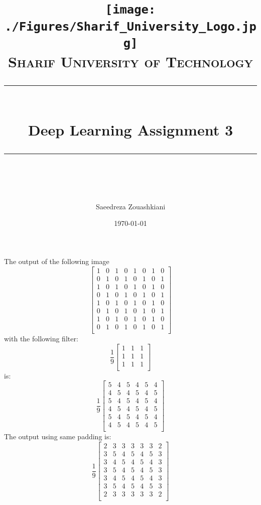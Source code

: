 \documentclass[11pt]{scrartcl} %
\title{	
	\texttt{[image: ./Figures/Sharif\_University\_Logo.jpg]}\\
	\normalfont\normalsize
	\textsc{Sharif University of Technology}\\ %
	\vspace{25pt} %
	\rule{\linewidth}{0.5pt}\\ %
	\vspace{20pt} %
	{\huge Deep Learning Assignment 3}\\ %
	\vspace{12pt} %
	\rule{\linewidth}{2pt}\\ %
	\vspace{12pt} %
}
\author{\LARGE Saeedreza Zouashkiani} %
\date{\normalsize\today} %
\begin{document}
\maketitle %

\section{} %
\subsection{} %
The output of the following image
\begin{equation}
\begin{bmatrix}
1 & 0 & 1 & 0 & 1 & 0 & 1 & 0\\
0 & 1 & 0 & 1 & 0 & 1 & 0 & 1\\
1 & 0 & 1 & 0 & 1 & 0 & 1 & 0\\
0 & 1 & 0 & 1 & 0 & 1 & 0 & 1\\
1 & 0 & 1 & 0 & 1 & 0 & 1 & 0\\
0 & 1 & 0 & 1 & 0 & 1 & 0 & 1\\
1 & 0 & 1 & 0 & 1 & 0 & 1 & 0\\
0 & 1 & 0 & 1 & 0 & 1 & 0 & 1\\
\end{bmatrix}
\end{equation}
with the following filter:
\begin{equation}
\frac{1}{9}
\begin{bmatrix}
1 & 1 & 1\\
1 & 1 & 1\\
1 & 1 & 1\\
\end{bmatrix}
\end{equation}
is:
\begin{equation}
\frac{1}{9}
\begin{bmatrix}
5 & 4 & 5 & 4 & 5 & 4 \\
4 & 5 & 4 & 5 & 4 & 5 \\
5 & 4 & 5 & 4 & 5 & 4 \\
4 & 5 & 4 & 5 & 4 & 5 \\
5 & 4 & 5 & 4 & 5 & 4 \\
4 & 5 & 4 & 5 & 4 & 5 \\
\end{bmatrix}
\end{equation}
The output using same padding is:
\begin{equation}
\frac{1}{9}
\begin{bmatrix}
2 & 3 & 3 & 3 & 3 & 3 & 2\\
3 & 5 & 4 & 5 & 4 & 5 & 3\\
3 & 4 & 5 & 4 & 5 & 4 & 3\\
3 & 5 & 4 & 5 & 4 & 5 & 3\\
3 & 4 & 5 & 4 & 5 & 4 & 3\\
3 & 5 & 4 & 5 & 4 & 5 & 3\\
2 & 3 & 3 & 3 & 3 & 3 & 2\\
\end{bmatrix}
\end{equation}
\end{document}
